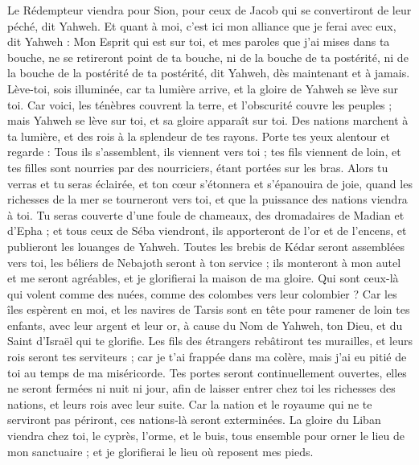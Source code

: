 \begin{multicols}{2}
Le Rédempteur viendra pour Sion, pour ceux de Jacob qui se convertiront de leur péché, dit Yahweh.
Et quant à moi, c'est ici mon alliance que je ferai avec eux, dit Yahweh : Mon Esprit qui est sur toi, et mes paroles que j'ai mises dans ta bouche, ne se retireront point de ta bouche, ni de la bouche de ta postérité, ni de la bouche de la postérité de ta postérité, dit Yahweh, dès maintenant et à jamais.
\VerseOne{}Lève-toi, sois illuminée, car ta lumière arrive, et la gloire de Yahweh se lève sur toi.
Car voici, les ténèbres couvrent la terre, et l'obscurité couvre les peuples ; mais Yahweh se lève sur toi, et sa gloire apparaît sur toi.
Des nations marchent à ta lumière, et des rois à la splendeur de tes rayons.
Porte tes yeux alentour et regarde : Tous ils s'assemblent, ils viennent vers toi ; tes fils viennent de loin, et tes filles sont nourries par des nourriciers, étant portées sur les bras.
Alors tu verras et tu seras éclairée, et ton cœur s'étonnera et s'épanouira de joie, quand les richesses de la mer se tourneront vers toi, et que la puissance des nations viendra à toi.
Tu seras couverte d'une foule de chameaux, des dromadaires de Madian et d'Epha ; et tous ceux de Séba viendront, ils apporteront de l'or et de l'encens, et publieront les louanges de Yahweh.
Toutes les brebis de Kédar seront assemblées vers toi, les béliers de Nebajoth seront à ton service ; ils monteront à mon autel et me seront agréables, et je glorifierai la maison de ma gloire.
Qui sont ceux-là qui volent comme des nuées, comme des colombes vers leur colombier ?
Car les îles espèrent en moi, et les navires de Tarsis sont en tête pour ramener de loin tes enfants, avec leur argent et leur or, à cause du Nom de Yahweh, ton Dieu, et du Saint d'Israël qui te glorifie.
Les fils des étrangers rebâtiront tes murailles, et leurs rois seront tes serviteurs ; car je t'ai frappée dans ma colère, mais j'ai eu pitié de toi au temps de ma miséricorde.
Tes portes seront continuellement ouvertes, elles ne seront fermées ni nuit ni jour, afin de laisser entrer chez toi les richesses des nations, et leurs rois avec leur suite.
Car la nation et le royaume qui ne te serviront pas périront, ces nations-là seront exterminées.
La gloire du Liban viendra chez toi, le cyprès, l'orme, et le buis, tous ensemble pour orner le lieu de mon sanctuaire ; et je glorifierai le lieu où reposent mes pieds.

\end{multicols}
